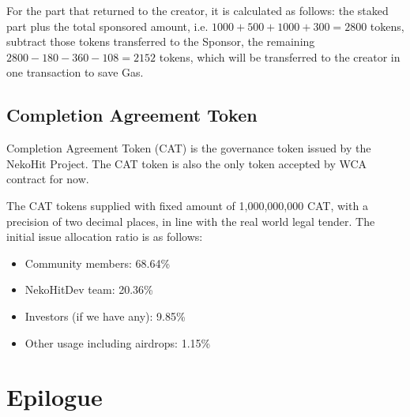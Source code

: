 \documentclass[12pt,a4paper]{article}
\begin{document}
    For the part that returned to the creator, it is calculated as follows:
    the staked part plus the total sponsored amount, i.e.
    $1000 + 500 + 1000 + 300 = 2800$ tokens, subtract those tokens transferred to the Sponsor,
    the remaining $2800 - 180 - 360 - 108 = 2152$ tokens, which will be
    transferred to the creator in one transaction to save Gas.

    \subsection{Completion Agreement Token}\label{subsec:cat}

    Completion Agreement Token (CAT) is the governance token
    issued by the NekoHit Project. The CAT token is also the
    only token accepted by WCA contract for now.

    The CAT tokens supplied with fixed amount of 1,000,000,000
    CAT, with a precision of two decimal places, in line with
    the real world legal tender. The initial issue allocation
    ratio is as follows:

    \begin{itemize}
        \item Community members: 68.64\%
        \item NekoHitDev team: 20.36\%
        \item Investors (if we have any): 9.85\%
        \item Other usage including airdrops: 1.15\%
    \end{itemize}


    \section{Epilogue}\label{sec:end}
\end{document}
